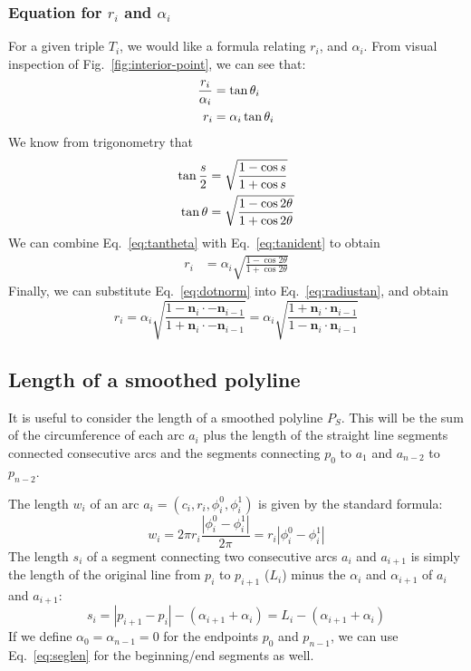 \documentclass{article}
\begin{document}
\subsubsection{Equation for $r_i$ and $\alpha_{i}$}
%
For a given triple $T_{i}$, we would like a formula relating $r_{i}$, and $\alpha_{i}$.  From visual inspection of Fig.~\ref{fig:interior-point}, we can see that:
%
\begin{align}
  \notag
  \frac{r_i}{\alpha_{i}} &= \tan \theta_i\\
  \label{eq:tantheta}
  r_i &= \alpha_{i}\tan \theta_i
\end{align}
%
We know from trigonometry that
%
\begin{align}
  \notag
  \tan \frac{s}{2} &= \sqrt{\frac{1-\cos s}{1+\cos s}}\\
  \label{eq:tanident}
  \tan \theta &= \sqrt{\frac{1-\cos 2\theta}{1+\cos 2\theta}}
\end{align}
%
We can combine Eq.~\eqref{eq:tantheta} with Eq.~\eqref{eq:tanident} to obtain
%
\begin{align}
  \label{eq:radiustan}
  r_{i} &= \alpha_i\sqrt{\frac{1-\cos 2\theta}{1+\cos 2\theta}}
\end{align}
%
Finally, we can substitute Eq.~\eqref{eq:dotnorm} into Eq.~\eqref{eq:radiustan}, and obtain
%
\begin{equation}
  \label{eq:radius-alpha}
  r_{i} = \alpha_i\sqrt{\frac{1-\mathbf{n}_i\cdot -\mathbf{n}_{i-1}}{1+\mathbf{n}_i\cdot -\mathbf{n}_{i-1}}} = \alpha_i\sqrt{\frac{1+\mathbf{n}_i\cdot \mathbf{n}_{i-1}}{1-\mathbf{n}_i\cdot \mathbf{n}_{i-1}}}
\end{equation}
%
\subsection{Length of a smoothed polyline}
\label{sec:length-smooth-polyl}
%
It is useful to consider the length of a smoothed polyline $P_S$.  This will be the sum of the circumference of each arc $a_i$ plus the length of the straight line segments connected consecutive arcs and the segments connecting $p_0$ to $a_1$ and $a_{n-2}$ to $p_{n-2}$.

The length $w_i$ of an arc $a_i = \left(c_i, r_i, \phi^0_i, \phi^1_i\right)$ is given by the standard formula:
%
\begin{equation}
  \label{eq:circumference}
  w_i  = 2\pi r_i \frac{\left|\phi^0_i - \phi^1_i\right|}{2\pi} = r_i \left|\phi^0_i - \phi^1_i\right|
\end{equation}
%
The length $s_i$ of a segment connecting two consecutive arcs $a_{i}$ and $a_{i+1}$ is simply the length of the original line from $p_i$ to $p_{i+1}$ ($L_i$) minus the $\alpha_i$ and $\alpha_{i+1}$ of $a_i$ and $a_{i+1}$:
%
\begin{equation}
  \label{eq:seglen}
  s_i = \left|p_{i+1} - p_{i}\right| - (\alpha_{i+1} + \alpha_{i}) = L_{i} - (\alpha_{i+1} + \alpha_{i})
\end{equation}
%
If we define $\alpha_0 = \alpha_{n-1} = 0$ for the endpoints $p_0$ and $p_{n-1}$, we can use Eq.~\eqref{eq:seglen} for the beginning/end segments as well.
\end{document}
